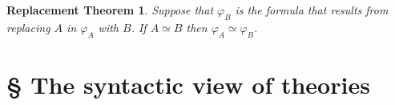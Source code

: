 \documentclass[11pt,fleqn]{article}
\newtheorem*{rthm}{Replacement Theorem}
\theoremstyle{definition}
\theoremstyle{remark}
\newcommand{\2}{\mathscr}
\newcommand{\vp}{\varphi}
\begin{document}
\begin{rthm} Suppose that $\vp _B$ is the formula that results from
  replacing $A$ in $\vp _A$ with $B$.  If $A\simeq B$ then $\vp
  _A\simeq \vp _B$. 
\end{rthm}



\section*{{\S}  The syntactic view of theories}

\end{document}
